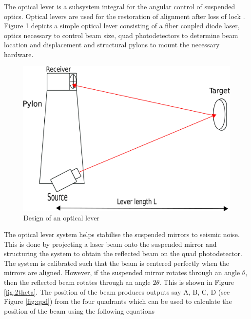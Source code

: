 \documentclass[colorlinks=true,pdfstartview=FitV,linkcolor=blue,
            citecolor=red,urlcolor=magenta]{ligodoc}
\newcommand{\G}[1]{\textcolor{JungleGreen}{#1}} %
\begin{document}
    


    


    The optical lever is a subsystem integral for the angular control of suspended optics. Optical levers are used for the restoration of alignment after loss of lock \cite{optlev_note}. Figure \ref{fig:oplev_schematic} depicts a simple optical lever consisting of a fiber coupled diode laser, optics necessary to control beam size, quad photodetectors to determine beam location and displacement and structural pylons to mount the necessary hardware. 

    \begin{figure}[htbp]
    \begin{center}
    \includegraphics[width =.7\linewidth]{oplev_schematic.pdf}
    \caption{Design of an optical lever}
    \label{fig:oplev_schematic}
    \end{center}
    \end{figure} 

    The optical lever system helps stabilise the suspended mirrors to seismic noise. This is done by projecting a laser beam onto the suspended mirror and structuring the system to obtain the reflected beam on the quad photodetector. The system is calibrated such that the beam is centered perfectly when the mirrors are aligned. However, if the suspended mirror rotates through an angle $\theta$, then the reflected beam rotates through an angle $2\theta$. This is shown in Figure \ref{fig:2theta}. The position of the beam produces outputs say A, B, C, D (see Figure \ref{fig:qpd}) from the four quadrants which can be used to calculate the position of the beam using the following equations \cite{qpd_equations}
\end{document}

